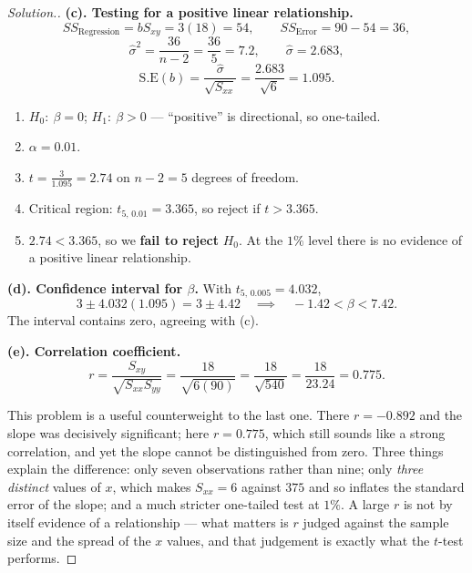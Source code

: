 \documentclass[11pt,a4paper]{article}
\theoremstyle{definition}
\newenvironment{solution}
  {\renewcommand{\qedsymbol}{}\begin{proof}[\textit{Solution}.]}
  {\end{proof}}
\begin{document}
\begin{solution}
\textbf{(c). Testing for a positive linear relationship.}
\[SS_{\text{Regression}}=bS_{xy}=3(18)=54,\qquad SS_{\text{Error}}=90-54=36,\]
\[\hat{\sigma}^2=\frac{36}{n-2}=\frac{36}{5}=7.2,\qquad \hat{\sigma}=2.683,\]
\[\text{S.E}(b)=\frac{\hat{\sigma}}{\sqrt{S_{xx}}}=\frac{2.683}{\sqrt{6}}=1.095.\]
\begin{enumerate}
\item $H_0:\ \beta=0$; $H_1:\ \beta>0$ --- ``positive'' is directional, so one-tailed.
\item $\alpha=0.01$.
\item $t=\frac{3}{1.095}=2.74$ on $n-2=5$ degrees of freedom.
\item Critical region: $t_{5,\,0.01}=3.365$, so reject if $t>3.365$.
\item $2.74<3.365$, so we \textbf{fail to reject} $H_0$. At the $1\%$ level there is no
evidence of a positive linear relationship.
\end{enumerate}

\textbf{(d). Confidence interval for $\beta$.} With $t_{5,\,0.005}=4.032$,
\[3\pm 4.032(1.095)=3\pm 4.42\quad\implies\quad -1.42<\beta<7.42.\]
The interval contains zero, agreeing with (c).

\textbf{(e). Correlation coefficient.}
\[r=\frac{S_{xy}}{\sqrt{S_{xx}S_{yy}}}=\frac{18}{\sqrt{6(90)}}=\frac{18}{\sqrt{540}}
=\frac{18}{23.24}=0.775.\]

This problem is a useful counterweight to the last one. There $r=-0.892$ and the slope was
decisively significant; here $r=0.775$, which still sounds like a strong correlation, and yet
the slope cannot be distinguished from zero. Three things explain the difference: only
seven observations rather than nine; only \emph{three distinct} values of $x$, which makes
$S_{xx}=6$ against $375$ and so inflates the standard error of the slope; and a much stricter
one-tailed test at $1\%$. A large $r$ is not by itself evidence of a relationship --- what
matters is $r$ judged against the sample size and the spread of the $x$ values, and that
judgement is exactly what the $t$-test performs.
\end{solution}
\end{document}
